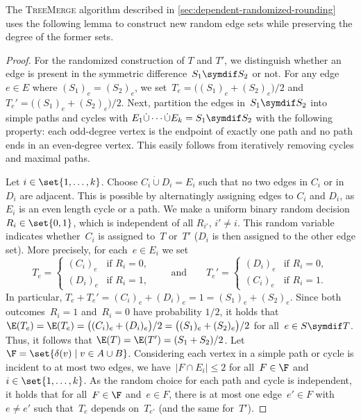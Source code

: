 \documentclass[a4paper,USenglish,cleveref,thm-restate]{lipics-v2021}
\begin{document}
The \textsc{TreeMerge} algorithm described in \cref{sec:dependent-randomized-rounding} uses the following lemma to construct new random edge sets while preserving the degree of the former sets.

\EdgeSetDecomposition*

\begin{proof}
    For the randomized construction of $T$ and $T'$, we distinguish whether an edge is present in the symmetric difference~$S_1 \symdif S_2$ or not.
    For any edge~$e \in E$ where $(S_1)_e = (S_2)_e$, we set~$T_e = \big((S_1)_e + (S_2)_e \big)/2$ and~$T_e' = \big((S_1)_e + (S_2)_e \big)/2$.
    Next, partition the edges in~$S_1 \symdif S_2$ into simple paths and cycles with $E_1\dot\cup \cdots \dot\cup E_k = S_1 \symdif S_2$ with the following property: each odd-degree vertex is the endpoint of exactly one path and no path ends in an even-degree vertex.
    This easily follows from iteratively removing cycles and maximal paths.

    Let $i\in\set{1,\dotsc,k}$. Choose $C_i \dot\cup D_i = E_i$ such that no two edges in $C_i$ or in $D_i$ are adjacent. This is possible by alternatingly assigning edges to $C_i$ and $D_i$, as $E_i$ is an even length cycle or a path.
    We make a uniform binary random decision $R_{i} \in \set{0,1}$, which is independent of all $R_{i'}$, $i'\neq i$.
    This random variable indicates whether~$C_i$ is assigned to~$T$ or~$T'$ ($D_i$ is then assigned to the other edge set).
    More precisely, for each~$e \in E_i$ we set 
    \begin{equation}
        \label{eq:mom-random-matching-choice-for-pair}
        T_e = 
        \begin{cases}
            (C_i)_e & \text{if } R_{i} = 0, \\
            (D_i)_e & \text{if } R_{i} = 1,
        \end{cases}
        \qquad \text{and} \qquad 
        T_e' = 
        \begin{cases}
            (D_i)_e & \text{if } R_{i} = 0, \\
            (C_i)_e & \text{if } R_{i} = 1.
        \end{cases}
    \end{equation}
    In particular, $T_e + T_e' = (C_i)_e + (D_i)_e = 1 = (S_1)_e + (S_2)_e$.
    Since both outcomes~$R_i = 1$ and~$R_i = 0$ have probability $1/2$, it holds that $\E(T_e) = \E(T_e) = \big((C_i)_e + (D_i)_e \big)/2 = \big((S_1)_e + (S_2)_e \big)/2$ for all~$e \in S \symdif T$.
    Thus, it follows that $\E(T) = \E(T') = (S_1+S_2)/2$.
    Let~$\F = \set{\delta(v) \mid v \in A \cup B}$.
    Considering each vertex in a simple path or cycle is incident to at most two edges, we have~$| F \cap E_i| \le 2$ for all~$F \in \F$ and~$i \in \set{1, \dotsc, k}$.
    As the random choice for each path and cycle is independent, it holds that for all~$F \in \F$ and~$e \in F$, there is at most one edge~$e' \in F$ with~$e \neq e'$ such that~$T_e$ depends on~$T_{e'}$ (and the same for~$T'$).
    

\end{proof}
\end{document}
